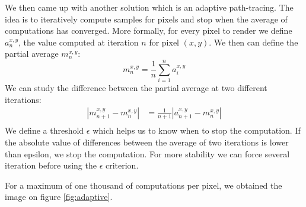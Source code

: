 \documentclass[acmsmall]{acmart}
\begin{document}
We then came up with another solution which is an adaptive path-tracing.
The idea is to iteratively compute samples for pixels and stop when the average of computations has converged.
More formally, for every pixel to render we define $a^{x,y}_n$, the value computed at iteration $n$ for pixel $(x,y)$. We then can define the partial average $m^{x,y}_n$:
\[m^{x,y}_n = \frac{1}{n} \sum^{n}_{i=1}a^{x,y}_i\]
We can study the difference between the partial average at two different iterations:
\begin{align}
| m^{x,y}_{n+1} -m^{x,y}_{n} | &=  \frac{1}{n+1}|a^{x,y}_{n+1} -  m^{x,y}_{n}|\\
\end{align}
We define a threshold $\epsilon$ which helps us to know when to stop the computation. If the absolute value of differences between the average of two iterations is lower than epsilon, we stop the computation.
For more stability we can force several iteration before using the $\epsilon$ criterion.

For a maximum of one thousand of computations per pixel, we obtained the image on figure \ref{fig:adaptive}.
\end{document}
